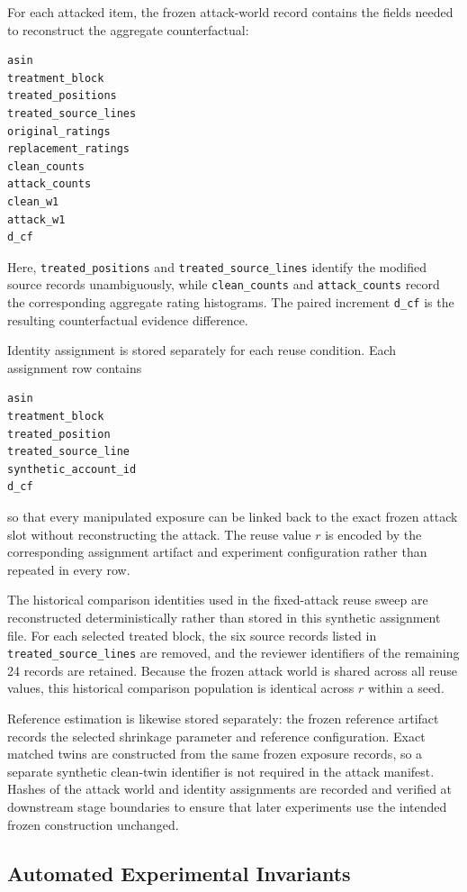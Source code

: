 For each attacked item, the frozen attack-world record contains the fields
needed to reconstruct the aggregate counterfactual:
\begin{verbatim}
asin
treatment_block
treated_positions
treated_source_lines
original_ratings
replacement_ratings
clean_counts
attack_counts
clean_w1
attack_w1
d_cf
\end{verbatim}
Here, \texttt{treated\_positions} and \texttt{treated\_source\_lines} identify
the modified source records unambiguously, while \texttt{clean\_counts} and
\texttt{attack\_counts} record the corresponding aggregate rating histograms.
The paired increment \texttt{d\_cf} is the resulting counterfactual evidence
difference.

Identity assignment is stored separately for each reuse condition. Each
assignment row contains
\begin{verbatim}
asin
treatment_block
treated_position
treated_source_line
synthetic_account_id
d_cf
\end{verbatim}
so that every manipulated exposure can be linked back to the exact frozen
attack slot without reconstructing the attack. The reuse value $r$ is encoded
by the corresponding assignment artifact and experiment configuration rather
than repeated in every row.

The historical comparison identities used in the fixed-attack reuse sweep
are reconstructed deterministically rather than stored in this synthetic
assignment file. For each selected treated block, the six source records
listed in
\texttt{treated\_source\_lines}
are removed, and the reviewer identifiers of the remaining 24 records are
retained. Because the frozen attack world is shared across all reuse values,
this historical comparison population is identical across $r$ within a seed.

Reference estimation is likewise stored separately: the frozen reference
artifact records the selected shrinkage parameter and reference configuration.
Exact matched twins are constructed from the same frozen exposure records, so a
separate synthetic clean-twin identifier is not required in the attack
manifest.  Hashes of the attack world and identity assignments are recorded and
verified at downstream stage boundaries to ensure that later experiments use
the intended frozen construction unchanged.


\subsection{Automated Experimental Invariants}
\label{sec:supp-invariants}

